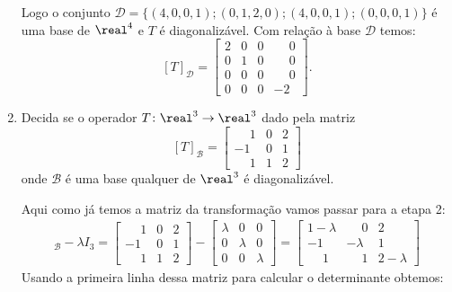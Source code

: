 \begin{exemplo}
\begin{enumerate}[label={\arabic*})]
\begin{solucao}
                Logo o conjunto $\mathcal{D} = \{(4, 0, 0, 1); (0, 1, 2, 0); (4, 0, 0, 1); (0, 0, 0, 1)\}$ é uma base de $\real^4$ e $T$ é diagonalizável. Com relação à base $\mathcal{D}$ temos:
                \[
                    [T]_\mathcal{D} = \begin{bmatrix}2 & 0 & 0 & \phantom{-}0\\0 & 1 & 0 & \phantom{-}0\\0 & 0 & 0 & \phantom{-}0\\0 & 0 & 0 & -2\end{bmatrix}.
                \]
            \end{solucao}

        \item Decida se o operador $T \colon \real^3 \to \real^3$ dado pela matriz
            \[
                [T]_\mathcal{B} = \begin{bmatrix}\phantom{-}1 & 0 & 2\\-1 & 0 & 1\\\phantom{-}1 & 1 & 2\end{bmatrix}
            \]
            onde $\mathcal{B}$ é uma base qualquer de $\real^3$ é diagonalizável.
            \begin{solucao}
                Aqui como já temos a matriz da transformação vamos passar para a etapa 2:
                \begin{align*}
                    [T]_\mathcal{B} - \lambda I_3 = \begin{bmatrix}\phantom{-}1 & 0 & 2\\-1 & 0 & 1\\\phantom{-}1 & 1 & 2\end{bmatrix} - \begin{bmatrix} \lambda & 0 & 0\\0 & \lambda & 0\\0 & 0 & \lambda\end{bmatrix} = \begin{bmatrix}1 - \lambda & \phantom{-}0 & 2\\-1 & -\lambda & 1\\\phantom{-}1 & \phantom{-}1 &2 - \lambda\end{bmatrix}
                \end{align*}
                Usando a primeira linha dessa matriz para calcular o determinante obtemos:
                \begin{align*}

\end{align*}
\end{solucao}
\end{enumerate}
\end{exemplo}
